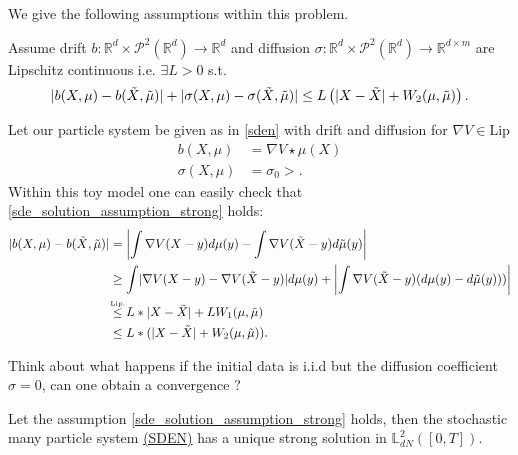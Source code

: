 We give the following assumptions within this problem.
\begin{assumption}\label{sde_solution_assumption_strong}
Assume drift  $b : \mathbb{R}^{d} \times  \mathcal{P}^2(\mathbb{R}^{d} ) \to  \mathbb{R}^{d} $ and diffusion $\sigma : \mathbb{R}^{d} \times  \mathcal{P}^2(\mathbb{R}^{d} ) \to \mathbb{R}^{d \times  m}  $   are Lipschitz continuous i.e. $\exists  L >0$ s.t.
 \begin{align*}
  \lvert b(X,\mu ) - b(\tilde{X},\tilde{\mu }  )\rvert + \lvert\sigma(X,\mu ) - \sigma(\tilde{X},\tilde{\mu }  )\rvert \le  L \left( \lvert X - \tilde{X} \rvert + W_2(\mu ,\tilde{\mu } ) \right) 
 .\end{align*}
\end{assumption}
\begin{example}
  Let our particle system be given as in \autoref{sden} with drift and diffusion for $\nabla V \in  \text{Lip}$
 \begin{align*}
   b(X,\mu )&= \nabla V \star  \mu(X)\\
   \sigma(X,\mu ) &= \sigma_0 >
 .\end{align*}
 Within this toy model one can easily check that \autoref{sde_solution_assumption_strong} holds:
 \begin{align*}
 \abs{b(X,\mu ) - b(\tilde{X},\tilde{\mu }  )} &= \abs*{\int \nabla V(X-y) d\mu(y) - \int  \nabla V(\tilde{X}-y ) d \tilde{\mu }(y) }\\
 &\ge \int \abs{\nabla V(X-y) - \nabla V(\tilde{X}-y )}d\mu (y) + \abs*{\int \nabla V(\tilde{X} - y)(d\mu(y) - d \tilde{\mu }(y) ) )}\\
 &\myS{Lip.}{\le }L*\abs{X - \tilde{X} } + LW_1(\mu ,\tilde{\mu } ) \\
 &\le L*(\abs{X-\tilde{X} } + W_2(\mu,\tilde{\mu } ))
 .\end{align*}
\end{example}
\begin{exercise}
 Think about what happens if the initial data is i.i.d but the diffusion coefficient $\sigma=0$, can one obtain a convergence ?
\end{exercise}
\begin{theorem}
  Let the assumption \autoref{sde_solution_assumption_strong} holds, then the stochastic many particle system \hyperref[sden]{(SDEN)} has a unique strong solution in $\mathbb{L}^{2}_{dN}([0,T]) $.
\end{theorem}
